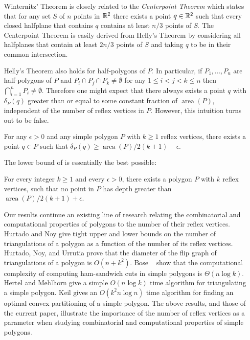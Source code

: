 \documentclass{article}
\DeclareMathOperator{\area}{area}
\begin{document}
Winternitz' Theorem is closely related to the \emph{Centerpoint
Theorem} \cite{m02,pa95} which states that for any set $S$ of $n$
points in $\mathbb{R}^2$ there exists a point $q\in\mathbb{R}^2$ such that every
closed halfplane that contains $q$ contains at least $n/3$
points of $S$.  The Centerpoint Theorem is easily derived from Helly's
Theorem \cite{e93} by considering all halfplanes that contain at least
$2n/3$ points of $S$ and taking $q$ to be in their common
intersection.

Helly's Theorem also holds for half-polygons of $P$.  In particular,
if $P_1,\ldots,P_n$ are half-polygons of $P$ and $P_i\cap P_j\cap
P_k\neq \emptyset$ for any $1\le i < j < k\le n$ then $\bigcap_{i=1}^n
P_i\neq \emptyset$.  Therefore one might expect that there always
exists a point $q$ with $\delta_P(q)$ greater than or equal to some
constant fraction of $\area(P)$, independent of the number of reflex
vertices in $P$.  However, this intuition turns out to be false.

\begin{thm}
For any $\epsilon > 0$ and any simple polygon $P$ with $k \ge 1$
reflex vertices, there exists a point $q\in P$ such that
$\delta_P(q)\ge \area(P)/2(k+1)-\epsilon$.
\end{thm}

The lower bound of  is essentially the best
possible:

\begin{thm}
For every integer $k\ge 1$ and every $\epsilon > 0$,
there exists a polygon $P$ with $k$ reflex vertices, such that no point
in $P$ has depth greater than  $\area(P)/2(k+1) + \epsilon$.
\end{thm}

Our results continue an existing line of research relating the
combinatorial and computational properties of polygons to the number
of their reflex vertices.   Hurtado and Noy \cite{hn96} give tight
upper and lower bounds on the number of triangulations of a polygon as
a function of the number of its reflex vertices.  Hurtado, Noy, and
Urrutia \cite{hnu99} prove that the diameter of the flip graph of
triangulations of a polygon is $O(n+k^2)$.   Bose \etal\ \cite{geoham}
show that the computational complexity of computing ham-sandwich cuts
in simple polygons is $\Theta(n\log k)$.  Hertel and Mehlhorn
\cite{hm83} give a simple $O(n\log k)$ time algorithm for
triangulating a simple polygon.  Keil \cite{k85} gives an $O(k^2 n\log
n)$ time algorithm for finding an optimal convex partitioning of a
simple polygon.  The above results, and those of the current paper,
illustrate the importance of the number of reflex vertices as a
parameter when studying combinatorial and computational properties of
simple polygons.
\end{document}
